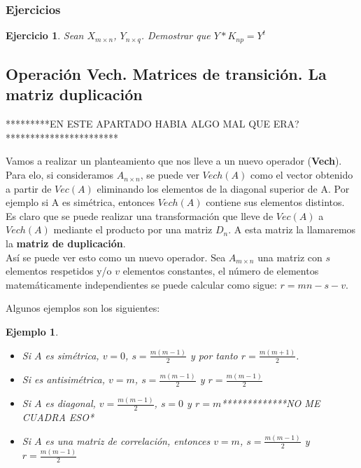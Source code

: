 \documentclass{article}
\theoremstyle{theorem-style}  %
\theoremstyle{definition-style}
\theoremstyle{example-style}
\newtheorem{example}{Ejemplo}[section]
\theoremstyle{exercise-style}
\newtheorem{exercise}{Ejercicio}[section]
\begin{document}
	\subsubsection{Ejercicios}
	\begin{exercise}
		Sean $X_{m \times n}$, $Y_{n \times q}$. Demostrar que $Y*K_{np}=Y^t$
	\end{exercise}
	
	\subsection{Operación Vech. Matrices de transición. La matriz duplicación}
	
	*********EN ESTE APARTADO HABIA ALGO MAL QUE ERA? ***********************
	
	Vamos a realizar un planteamiento que nos lleve a un nuevo operador (\textbf{Vech}). Para elo, si consideramos $A_{n \times n}$, se puede ver $Vech(A)$ como el vector obtenido a partir de $Vec(A)$ eliminando los elementos de la diagonal superior de A. Por ejemplo si A es simétrica, entonces $Vech(A)$ contiene sus elementos distintos. \\
	
	Es claro que se puede realizar una transformación que lleve de $Vec(A)$ a $Vech(A)$ mediante el producto por una matriz $D_n$. A esta matriz la llamaremos la \textbf{matriz de duplicación}. \\
	
	Así se puede ver esto como un nuevo operador. Sea $A_{m \times n}$ una matriz con $s$ elementos respetidos y/o $v$ elementos constantes, el número de elementos matemáticamente independientes se puede calcular como sigue: $r=mn-s-v$.  
	
	Algunos ejemplos son los siguientes:
	
	\begin{example}	
		\begin{itemize}
			\item Si $A$ es simétrica, $v=0$, $s=\frac{m(m-1)}{2}$ y  por tanto $r=\frac{m(m+1)}{2}$.
			
			\item Si es antisimétrica, $v=m$, $s=\frac{m(m-1)}{2}$ y $r= \frac{m(m-1)}{2}$
			
			\item Si $A$ es diagonal, $v=\frac{m(m-1)}{2}$, $s=0$ y $r= m$*************NO ME CUADRA ESO* 
			
			\item Si $A$ es una matriz de correlación, entonces $v=m$, $s=\frac{m(m-1)}{2}$ y $r= \frac{m(m-1)}{2}$
		\end{itemize}
	\end{example}
	
\end{document}
